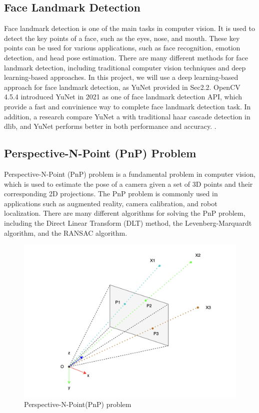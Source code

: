 \subsection{Face Landmark Detection}
Face landmark detection is one of the main tasks in computer vision. It is used to detect the key points of a face, such as the eyes, nose, and mouth. These key points can be used for various applications, such as face recognition, emotion detection, and head pose estimation. There are many different methods for face landmark detection, including traditional computer vision techniques and deep learning-based approaches. In this project, we will use a deep learning-based approach for face landmark detection, as YuNet provided in Sec2.2. OpenCV 4.5.4\cite{opencv_4_5_4} introduced YuNet in 2021 as one of face landmark detection API, which provide a fast and convinience way to complete face landmark detection task. In addition, a research compare YuNet a with traditional haar cascade detection in dlib, and YuNet performs better in both performance and accuracy. \cite{chen2022opencv}.

\subsection{Perspective-N-Point (PnP) Problem}
Perspective-N-Point (PnP) problem is a fundamental problem in computer vision, which is used to estimate the pose of a camera given a set of 3D points and their corresponding 2D projections. The PnP problem is commonly used in applications such as augmented reality, camera calibration, and robot localization. There are many different algorithms for solving the PnP problem, including the Direct Linear Transform (DLT) method, the Levenberg-Marquardt algorithm, and the RANSAC algorithm. 

\begin{figure}[htb]
    \centering
    \includegraphics[width=1\textwidth]{figures/Introduction/PnP.png}
    \caption{Perspective-N-Point(PnP) problem}\label{F:test-a}
\end{figure}


